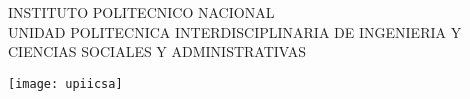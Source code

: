 \begin{titlepage}
\BgThispage
\thispagestyle{empty}
\begin{center}
\begin{spacing}{1.5}
{\Huge INSTITUTO POLITECNICO NACIONAL}\\
{\Large UNIDAD POLITECNICA INTERDISCIPLINARIA DE
INGENIERIA Y CIENCIAS SOCIALES Y ADMINISTRATIVAS}\\[2cm]
\end{spacing}
\texttt{[image: upiicsa]}\\[2cm] 
\end{center}

\end{titlepage}
